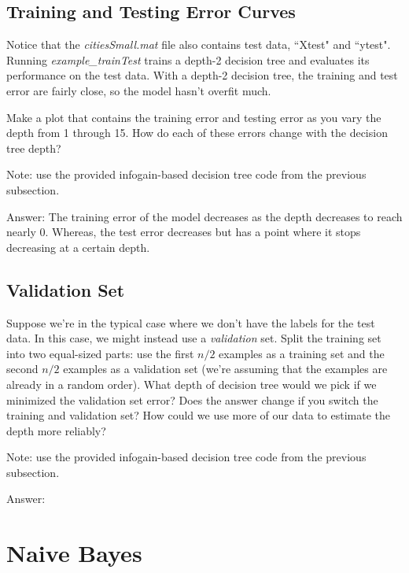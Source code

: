 \documentclass{article}
\def\ans#1{\par\gre{Answer: #1}}
\def\blu#1{{\color{blu}#1}}
\def\gre#1{{\color{gre}#1}}
\begin{document}
\pagebreak

\subsection{Training and Testing Error Curves}

Notice that the \emph{citiesSmall.mat} file also contains test data, ``Xtest" and ``ytest".
Running \emph{example\_trainTest} trains a depth-2 decision tree and evaluates its performance on the test data. %
With a depth-2 decision tree, the training and test error are fairly close, so the model hasn't overfit much.


\blu{Make a plot that contains the training error and testing error as you vary the depth from 1 through 15. How do each of these errors change with the decision tree depth?}

Note: use the provided infogain-based decision tree code from the previous subsection.

\ans{The training error of the model decreases as the depth decreases to reach nearly 0. Whereas, the test error decreases but has a point where it stops decreasing at a certain depth.}

\pagebreak

\subsection{Validation Set}

Suppose we're in the typical case where we don't have the labels for the test data. In this case, we might instead use a \emph{validation} set. Split the training set into two equal-sized parts: use the first $n/2$ examples as a training set and the second $n/2$ examples as a validation set (we're assuming that the examples are already in a random order). \blu{What depth of decision tree would we pick if we minimized the validation set error? Does the answer change if you switch the training and validation set? How could we use more of our data to  estimate the depth more reliably?}

Note: use the provided infogain-based decision tree code from the previous subsection.

\ans{}

\pagebreak

\section{Naive Bayes}
\end{document}
